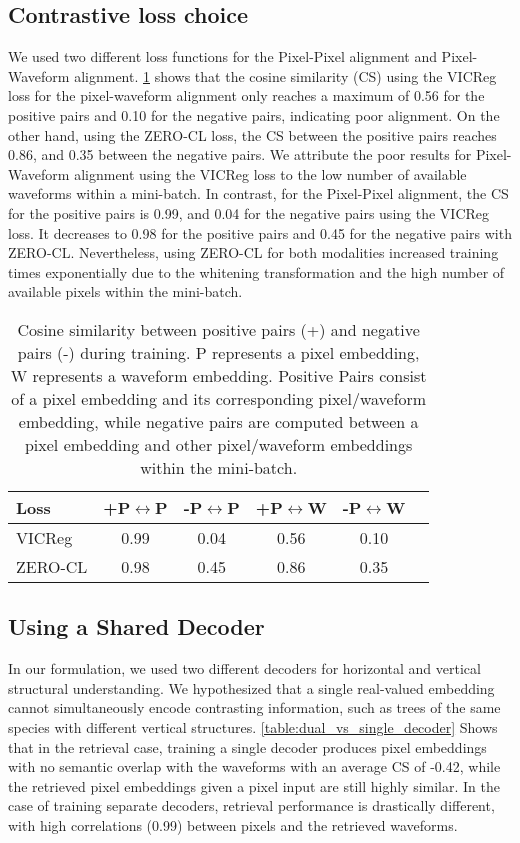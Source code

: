 \subsection{Contrastive loss choice}
We used two different loss functions for the Pixel-Pixel alignment and Pixel-Waveform alignment. \cref{table:cosine_sim_loss} shows that the cosine similarity (CS) using the VICReg loss for the pixel-waveform alignment only reaches a maximum of 0.56  for the positive pairs and 0.10 for the negative pairs, indicating poor alignment. On the other hand, using the ZERO-CL loss, the CS between the positive pairs reaches 0.86, and 0.35 between the negative pairs. We attribute the poor results for Pixel-Waveform alignment using the VICReg loss to the low number of available waveforms within a mini-batch. In contrast, for the Pixel-Pixel alignment, the CS for the positive pairs is 0.99, and 0.04 for the negative pairs using the VICReg loss. It decreases to 0.98 for the positive pairs and 0.45 for the negative pairs with ZERO-CL. Nevertheless, using ZERO-CL for both modalities increased training times exponentially due to the whitening transformation and the high number of available pixels within the mini-batch.         
\begin{table}[h]
\caption{Cosine similarity between positive pairs (+) and negative pairs (-) during training. P represents a pixel embedding, W represents a waveform embedding. Positive Pairs consist of a pixel embedding and its corresponding pixel/waveform embedding, while negative pairs are computed between a pixel embedding and other pixel/waveform embeddings within the mini-batch.\\}
\label{table:cosine_sim_loss}
\centering
\begin{tabular}{lccccc}
\toprule
Loss & +P$\leftrightarrow$P & -P$\leftrightarrow$P & +P$\leftrightarrow$W & -P$\leftrightarrow$W \\
\midrule
VICReg & 0.99 & 0.04 & 0.56 & 0.10 \\
ZERO-CL   & 0.98 & 0.45 & 0.86 & 0.35\\
\bottomrule
\end{tabular}


\end{table}

\subsection{Using a Shared Decoder}
In our formulation, we used two different decoders for horizontal and vertical structural understanding. We hypothesized that a single real-valued embedding cannot simultaneously encode contrasting information, such as trees of the same species with different vertical structures. \cref{table:dual_vs_single_decoder} Shows that in the retrieval case, training a single decoder produces pixel embeddings with no semantic overlap with the waveforms with an average CS of -0.42, while the retrieved pixel embeddings given a pixel input are still highly similar. In the case of training separate decoders, retrieval performance is drastically different, with high correlations (0.99) between pixels and the retrieved waveforms.       

